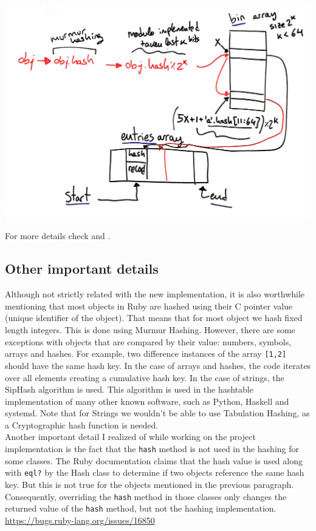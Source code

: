 \documentclass[oneside, 12pt]{article}
\theoremstyle{break}
\begin{document}
\centerline{\includegraphics[width=14cm]{hash}}

For more details check \cite{ruby_code} and \cite{ruby_feature12142}.

\subsection{Other important details}

Although not strictly related with the new implementation, it is also worthwhile mentioning that most objects in Ruby are hashed using their C pointer value (unique identifier of the object).
That means that for most object we hash fixed length integers.
This is done using Murmur Hashing.
However, there are some exceptions with objects that are compared by their value: numbers, symbols, arrays and hashes.
For example, two difference instances of the array \lstinline{[1,2]} should have the same hash key.
In the case of arrays and hashes, the code iterates over all elements creating a cumulative hash key.
In the case of strings, the SipHash algorithm is used.
This algorithm is used in the hashtable implementation of many other known software, such as Python, Haskell and systemd.
Note that for Strings we wouldn't be able to use Tabulation Hashing, as a Cryptographic hash function is needed.\\

\label{before}
Another important detail I realized of while working on the project implementation is the fact that the \lstinline{hash} method is not used in the hashing for some classes.
The Ruby documentation \cite{object-hash} claims that the hash value is used along with \lstinline{eql?} by the Hash class to determine if two objects reference the same hash key.
But this is not true for the objects mentioned in the previous paragraph.
Consequently, overriding the \lstinline{hash} method in those classes only changes the returned value of the \lstinline{hash} method, but not the hashing implementation.\\
\url{https://bugs.ruby-lang.org/issues/16850}\\
\end{document}
